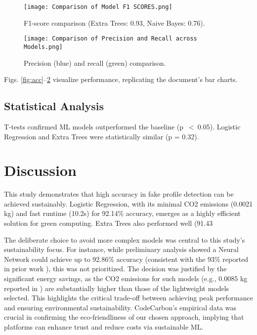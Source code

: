 \documentclass[conference]{IEEEtran}
\begin{document}
\begin{figure}[htbp]
\centerline{\texttt{[image: Comparison of Model F1 SCORES.png]}}
\caption{F1-score comparison (Extra Trees: 0.93, Naive Bayes: 0.76).}
\label{fig:f1}
\end{figure}

\begin{figure}[htbp]
\centerline{\texttt{[image: Comparison of Precision and Recall across Models.png]}}
\caption{Precision (blue) and recall (green) comparison.}
\label{fig:pr}
\end{figure}

Figs. \ref{fig:acc}--\ref{fig:pr} visualize performance, replicating the document’s bar charts.

\subsection{Statistical Analysis}
T-tests confirmed ML models outperformed the baseline (p~$<~$0.05). Logistic Regression and Extra Trees were statistically similar (p = 0.32).

\section{Discussion}
\label{sec:discuss}
This study demonstrates that high accuracy in fake profile detection can be achieved sustainably. Logistic Regression, with its minimal CO2 emissions (0.0021 kg) and fast runtime (10.2s) for 92.14\% accuracy, emerges as a highly efficient solution for green computing. Extra Trees also performed well (91.43%

The deliberate choice to avoid more complex models was central to this study's sustainability focus. For instance, while preliminary analysis showed a Neural Network could achieve up to 92.86\% accuracy (consistent with the 93\% reported in prior work \cite{b6}), this was not prioritized. The decision was justified by the significant energy savings, as the CO2 emissions for such models (e.g., 0.0085 kg reported in \cite{b6}) are substantially higher than those of the lightweight models selected. This highlights the critical trade-off between achieving peak performance and ensuring environmental sustainability. CodeCarbon's empirical data was crucial in confirming the eco-friendliness of our chosen approach, implying that platforms can enhance trust and reduce costs via sustainable ML.
\end{document}

